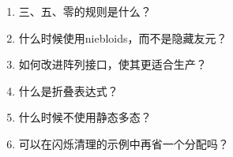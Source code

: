 \begin{enumerate}
\item
三、五、零的规则是什么？

\item
什么时候使用niebloids，而不是隐藏友元？

\item
如何改进阵列接口，使其更适合生产？

\item
什么是折叠表达式？

\item
什么时候不使用静态多态？

\item
可以在闪烁清理的示例中再省一个分配吗？
\end{enumerate}